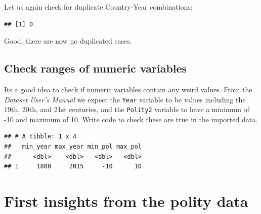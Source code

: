\documentclass[]{book}
\newenvironment{Shaded}{\begin{snugshade}}{\end{snugshade}}
\newcommand{\DataTypeTok}[1]{\textcolor[rgb]{0.13,0.29,0.53}{#1}}
\newcommand{\KeywordTok}[1]{\textcolor[rgb]{0.13,0.29,0.53}{\textbf{#1}}}
\newcommand{\NormalTok}[1]{#1}
\newcommand{\OperatorTok}[1]{\textcolor[rgb]{0.81,0.36,0.00}{\textbf{#1}}}
\newcommand{\StringTok}[1]{\textcolor[rgb]{0.31,0.60,0.02}{#1}}
\begin{document}
Let us again check for duplicate Country-Year combinations:

\begin{Shaded}
\end{Shaded}

\begin{verbatim}
## [1] 0
\end{verbatim}

Good, there are now no duplicated cases.

\hypertarget{check-ranges-of-numeric-variables}{%
\subsection{Check ranges of numeric variables}\label{check-ranges-of-numeric-variables}}

Its a good idea to check if numeric variables contain any weird values. From the \emph{Dataset User's Manual} we expect the \texttt{Year} variable to be values including the 19th, 20th, and 21st centuries, and the \texttt{Polity2} variable to have a minimum of -10 and maximum of 10. Write code to check these are true in the imported data.

\begin{Shaded}
\end{Shaded}

\begin{verbatim}
## # A tibble: 1 x 4
##   min_year max_year min_pol max_pol
##      <dbl>    <dbl>   <dbl>   <dbl>
## 1     1800     2015     -10      10
\end{verbatim}

\hypertarget{first-insights-from-the-polity-data}{%
\section{First insights from the polity data}\label{first-insights-from-the-polity-data}}
\end{document}
